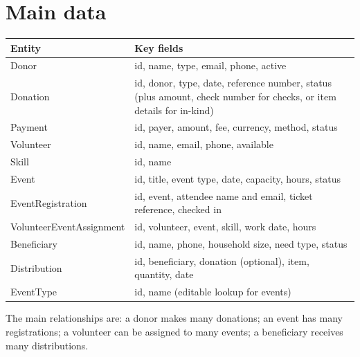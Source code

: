 \section{Main data}

\begin{center}
\small
\begin{tabularx}{\textwidth}{@{}L{0.26\textwidth}Y@{}}
\toprule
\textbf{Entity} & \textbf{Key fields} \\
\midrule
Donor & id, name, type, email, phone, active \\
Donation & id, donor, type, date, reference number, status (plus amount, check number for checks, or item details for in-kind) \\
Payment & id, payer, amount, fee, currency, method, status \\
Volunteer & id, name, email, phone, available \\
Skill & id, name \\
Event & id, title, event type, date, capacity, hours, status \\
EventRegistration & id, event, attendee name and email, ticket reference, checked in \\
VolunteerEventAssignment & id, volunteer, event, skill, work date, hours \\
Beneficiary & id, name, phone, household size, need type, status \\
Distribution & id, beneficiary, donation (optional), item, quantity, date \\
EventType & id, name (editable lookup for events) \\
\bottomrule
\end{tabularx}
\end{center}

The main relationships are: a donor makes many donations; an event has many registrations; a volunteer can be assigned to many events; a beneficiary receives many distributions.
